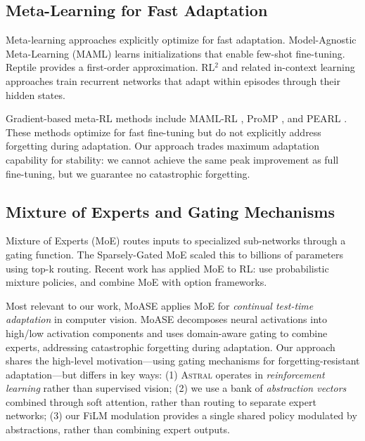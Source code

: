 \documentclass{article}
\newcommand{\astral}{\textsc{Astral}}
\newcommand{\method}{\astral}
\begin{document}
\subsection{Meta-Learning for Fast Adaptation}

Meta-learning approaches explicitly optimize for fast adaptation. Model-Agnostic Meta-Learning (MAML) \citep{finn2017maml} learns initializations that enable few-shot fine-tuning. Reptile \citep{nichol2018firstorder} provides a first-order approximation. RL$^2$ \citep{duan2016rl2} and related in-context learning approaches \citep{wang2016learning, mishra2018simple} train recurrent networks that adapt within episodes through their hidden states.

Gradient-based meta-RL methods include MAML-RL \citep{finn2017maml}, ProMP \citep{rothfuss2019promp}, and PEARL \citep{rakelly2019efficient}. These methods optimize for fast fine-tuning but do not explicitly address forgetting during adaptation. Our approach trades maximum adaptation capability for stability: we cannot achieve the same peak improvement as full fine-tuning, but we guarantee no catastrophic forgetting.

\subsection{Mixture of Experts and Gating Mechanisms}

Mixture of Experts (MoE) \citep{jacobs1991adaptive} routes inputs to specialized sub-networks through a gating function. The Sparsely-Gated MoE \citep{shazeer2017outrageously} scaled this to billions of parameters using top-k routing. Recent work has applied MoE to RL: \citet{ren2021probabilistic} use probabilistic mixture policies, and \citet{goyal2019reinforcement} combine MoE with option frameworks.

Most relevant to our work, MoASE \citep{zhang2024moase} applies MoE for \emph{continual test-time adaptation} in computer vision. MoASE decomposes neural activations into high/low activation components and uses domain-aware gating to combine experts, addressing catastrophic forgetting during adaptation. Our approach shares the high-level motivation---using gating mechanisms for forgetting-resistant adaptation---but differs in key ways: (1) \method{} operates in \emph{reinforcement learning} rather than supervised vision; (2) we use a bank of \emph{abstraction vectors} combined through soft attention, rather than routing to separate expert networks; (3) our FiLM modulation provides a single shared policy modulated by abstractions, rather than combining expert outputs.
\end{document}
